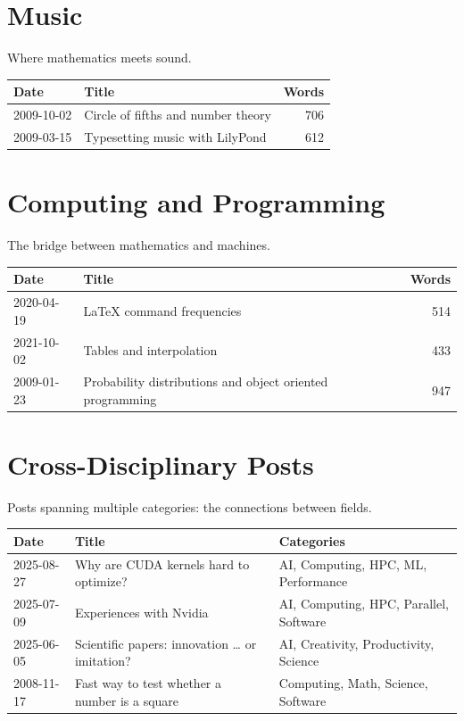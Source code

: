\bigskip

\section*{Music}

Where mathematics meets sound.

\begin{longtable}{l p{5.5cm} r}
\toprule
\textbf{Date} & \textbf{Title} & \textbf{Words} \tabularnewline
\midrule
2009-10-02 & Circle of fifths and number theory & 706 \tabularnewline
2009-03-15 & Typesetting music with LilyPond & 612 \tabularnewline
\bottomrule
\end{longtable}

\bigskip

\section*{Computing and Programming}

The bridge between mathematics and machines.

\begin{longtable}{l p{5.5cm} r}
\toprule
\textbf{Date} & \textbf{Title} & \textbf{Words} \tabularnewline
\midrule
2020-04-19 & LaTeX command frequencies & 514 \tabularnewline
2021-10-02 & Tables and interpolation & 433 \tabularnewline
2009-01-23 & Probability distributions and object oriented programming & 947 \tabularnewline
\bottomrule
\end{longtable}

\bigskip

\section*{Cross-Disciplinary Posts}

Posts spanning multiple categories: the connections between fields.

\begin{longtable}{l p{4cm} p{3.5cm}}
\toprule
\textbf{Date} & \textbf{Title} & \textbf{Categories} \tabularnewline
\midrule
2025-08-27 & Why are CUDA kernels hard to optimize? & AI, Computing, HPC, ML, Performance \tabularnewline
2025-07-09 & Experiences with Nvidia & AI, Computing, HPC, Parallel, Software \tabularnewline
2025-06-05 & Scientific papers: innovation … or imitation? & AI, Creativity, Productivity, Science \tabularnewline
2008-11-17 & Fast way to test whether a number is a square & Computing, Math, Science, Software \tabularnewline
\bottomrule
\end{longtable}

